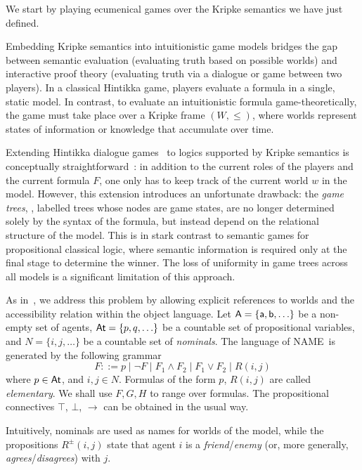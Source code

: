 
We start by playing ecumenical games over the Kripke semantics we have just defined. 

Embedding Kripke semantics into intuitionistic game models bridges the gap between semantic evaluation (evaluating truth based on possible worlds) and interactive proof theory (evaluating truth via a dialogue or game between two players). In a classical Hintikka game, players evaluate a formula in a single, static model. In contrast, to evaluate an intuitionistic formula game-theoretically, the game must take place over a Kripke frame $(W, \le)$, where worlds represent states of information or knowledge that accumulate over time.

Extending Hintikka dialogue games~\cite{Hintikka1973-HINLLA-2} to logics supported by Kripke semantics is conceptually straightforward~\cite{blackburn-synthese,Robert-PhD}: in addition to the current roles of the players and the current formula $F$, one only has to  keep track of the current world $w$ in the model. However, this extension introduces an unfortunate drawback: the {\em game trees}, \ie, labelled trees whose nodes are game states, are no longer determined solely by the syntax of the formula, but instead depend on the relational structure of the model. This is in stark contrast to semantic games for propositional classical logic, where semantic information is required only at the final stage to determine the winner. The loss of uniformity in game trees across all models is a significant limitation of this approach.

As in~\cite{blackburn-synthese,DBLP:conf/wollic/Freiman21,DBLP:conf/csl/PimentelOLFF25}, we address this problem by allowing explicit references to worlds and the accessibility relation within the object language. Let $\mathsf{A}=\{\mathsf{a},\mathsf{b},\ldots\}$ be a non-empty set of agents,
$\mathsf{At}=\{p,q,\ldots\}$ be a countable set of propositional variables, and $N=\{i,j,\ldots\}$ be a countable set of \emph{nominals}. The language of NAME~is generated by the following grammar
$$F  ::= p  \mid \neg F  \mid F_1  \wedge F_2  \mid F_1  \vee F_2  \mid  R(i,j) $$
where $p\in \mathsf{At}$, and $i,j\in N$.  Formulas of the form $p$, $R(i,j)$ are called \emph{elementary}. We shall use $F,G,H$ to range over formulas. 
The propositional connectives $\top$, $\bot$, $\to$ can be obtained in the usual way. 

Intuitively, nominals are used as names for worlds of the model, while the propositions $R^\pm(i,j)$ state that agent $i$ is a  \emph{friend}/\emph{enemy} (or, more generally, \emph{agrees}/\emph{disagrees}) with
 $j$. 


